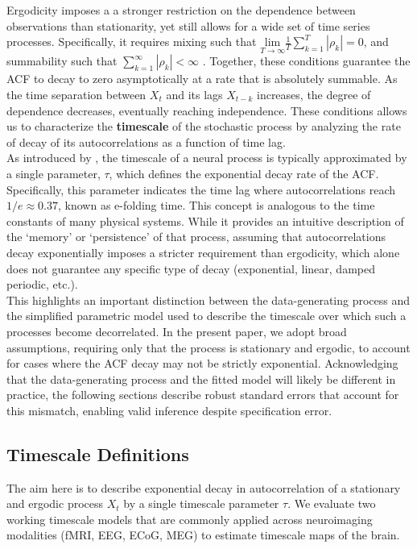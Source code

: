 \documentclass[main.tex]{subfiles}
\begin{document}
Ergodicity imposes a a stronger restriction on the dependence between observations than stationarity, yet still allows for a wide set of time series processes. Specifically, it requires mixing such that $\underset{T\to\infty}{\text{lim}} \frac{1}{T} \sum_{k=1}^T |\rho_k| = 0$, and summability such that $\sum_{k=1}^\infty |\rho_k| < \infty$ \citep[chapter~14.7]{hansen_econometrics_2022}. Together, these conditions guarantee the ACF to decay to zero asymptotically at a rate that is absolutely summable. As the time separation between $X_t$ and its lags $X_{t-k}$ increases, the degree of dependence decreases, eventually reaching independence. These conditions allows us to characterize the \textbf{timescale} of the stochastic process by analyzing the rate of decay of its autocorrelations as a function of time lag.\\

As introduced by \citet{murray_hierarchy_2014}, the timescale of a neural process is typically approximated by a single parameter, $\tau$, which defines the exponential decay rate of the ACF. Specifically, this parameter indicates the time lag where autocorrelations reach $1/e \approx 0.37$, known as e-folding time. This concept is analogous to the time constants of many physical systems. While it provides an intuitive description of the `memory' or `persistence' of that process, assuming that autocorrelations decay exponentially imposes a stricter requirement than ergodicity, which alone does not guarantee any specific type of decay (exponential, linear, damped periodic, etc.). \\

This highlights an important distinction between the data-generating process and the simplified parametric model used to describe the timescale over which such a processes become decorrelated. In the present paper, we adopt broad assumptions, requiring only that the process is stationary and ergodic, to account for cases where the ACF decay may not be strictly exponential. Acknowledging that the data-generating process and the fitted model will likely be different in practice, the following sections describe robust standard errors that account for this mismatch, enabling valid inference despite specification error.

\subsection{Timescale Definitions}
The aim here is to describe exponential decay in autocorrelation of a stationary and ergodic process $X_t$ by a single timescale parameter $\tau$. We evaluate two working timescale models that are commonly applied across neuroimaging modalities (fMRI, EEG, ECoG, MEG) to estimate timescale maps of the brain. 
\end{document}
